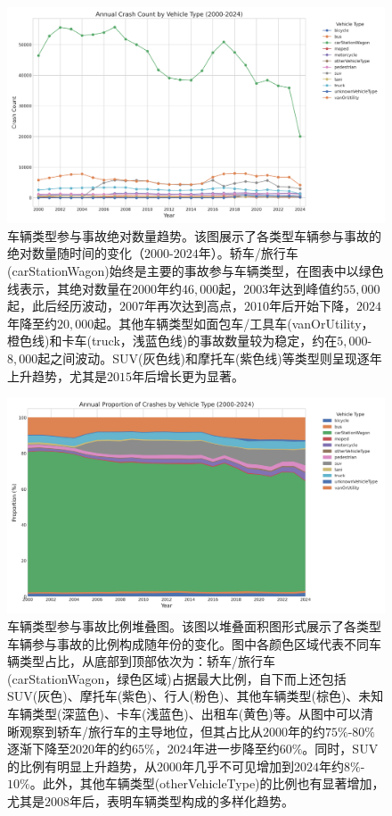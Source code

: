 \documentclass[12pt,a4paper]{article}
\begin{document}
\begin{figure}[H]
\centering
\includegraphics[height=0.25\textheight]{vehicle_type_trends.png}
\caption{车辆类型参与事故绝对数量趋势。该图展示了各类型车辆参与事故的绝对数量随时间的变化（$2000$-$2024$年）。轿车/旅行车(carStationWagon)始终是主要的事故参与车辆类型，在图表中以绿色线表示，其绝对数量在$2000$年约$46,000$起，$2003$年达到峰值约$55,000$起，此后经历波动，$2007$年再次达到高点，$2010$年后开始下降，$2024$年降至约$20,000$起。其他车辆类型如面包车/工具车(vanOrUtility，橙色线)和卡车(truck，浅蓝色线)的事故数量较为稳定，约在$5,000$-$8,000$起之间波动。SUV(灰色线)和摩托车(紫色线)等类型则呈现逐年上升趋势，尤其是$2015$年后增长更为显著。}
\label{fig:vehicle_type_trends}
\end{figure}

\begin{figure}[H]
\centering
\includegraphics[height=0.25\textheight]{vehicle_type_area_chart.png}
\caption{车辆类型参与事故比例堆叠图。该图以堆叠面积图形式展示了各类型车辆参与事故的比例构成随年份的变化。图中各颜色区域代表不同车辆类型占比，从底部到顶部依次为：轿车/旅行车(carStationWagon，绿色区域)占据最大比例，自下而上还包括SUV(灰色)、摩托车(紫色)、行人(粉色)、其他车辆类型(棕色)、未知车辆类型(深蓝色)、卡车(浅蓝色)、出租车(黄色)等。从图中可以清晰观察到轿车/旅行车的主导地位，但其占比从$2000$年的约$75\%$-$80\%$逐渐下降至$2020$年的约$65\%$，$2024$年进一步降至约$60\%$。同时，SUV的比例有明显上升趋势，从$2000$年几乎不可见增加到$2024$年约$8\%$-$10\%$。此外，其他车辆类型(otherVehicleType)的比例也有显著增加，尤其是$2008$年后，表明车辆类型构成的多样化趋势。}
\label{fig:vehicle_type_area_chart}
\end{figure}
\end{document}
